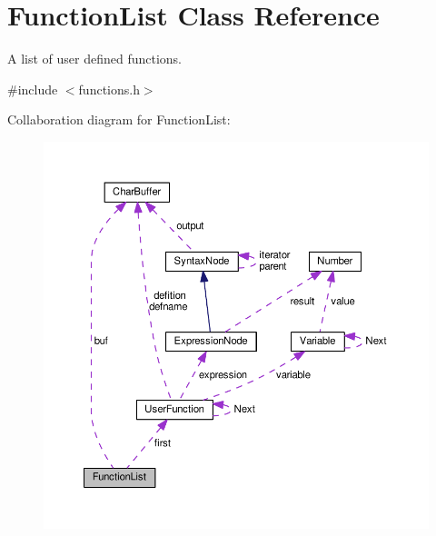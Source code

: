 \hypertarget{classFunctionList}{}\section{Function\+List Class Reference}
\label{classFunctionList}


A list of user defined functions.  




{\ttfamily \#include $<$functions.\+h$>$}



Collaboration diagram for Function\+List\+:
\nopagebreak
\begin{figure}[H]
\begin{center}
\leavevmode
\includegraphics[width=350pt]{db/d37/classFunctionList__coll__graph}
\end{center}
\end{figure}
